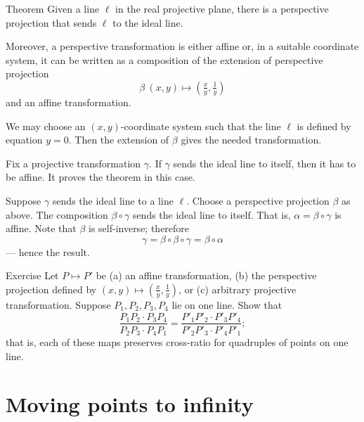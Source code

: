 \begin{thm}{Theorem}\label{thm:moving}
Given a line $\ell$ in the real projective plane, there is a perspective projection that sends $\ell$ to the ideal line.

Moreover, a perspective transformation is either affine or, in a suitable coordinate system, it can be written as a composition of the extension of perspective projection 
\[\beta\:(x,y)\mapsto (\tfrac xy,\tfrac 1y)\]
and an affine transformation.
\end{thm}

We may choose an $(x,y)$-coordinate system such that the line $\ell$ is defined by equation $y=0$.
Then the extension of $\beta$ gives the needed transformation.

Fix a projective transformation $\gamma$.
If $\gamma$ sends the ideal line to itself,
then it has to be affine. 
It proves the theorem in this case.

Suppose $\gamma$ sends the ideal line to a line $\ell$.
Choose a perspective projection $\beta$ as above.
The composition $\beta\circ\gamma$ sends the ideal line to itself.
That is, $\alpha=\beta\circ\gamma$ is affine.
Note that $\beta$ is self-inverse; therefore 
\[\gamma=\beta\circ\beta\circ\gamma=\beta\circ\alpha\]
--- hence the result.
\qeds

\begin{thm}{Exercise}\label{ex:proj-cross-ratio}
Let $P\mapsto P'$ be (a) an affine transformation, (b) the perspective projection defined by $(x,y)\mapsto (\tfrac xy,\tfrac 1y)$, or (c) arbitrary projective transformation.
Suppose $P_1,P_2,P_3,P_4$ lie on one line.
Show that 
\[\frac{P_1P_2\cdot P_3P_4}{P_2P_3\cdot P_4P_1}=\frac{P'_1P'_2\cdot P'_3P'_4}{P'_2P'_3\cdot P'_4P'_1};\]
that is, each of these maps preserves cross-ratio for quadruples of points on one line.

\end{thm}



\section{Moving points to infinity}

